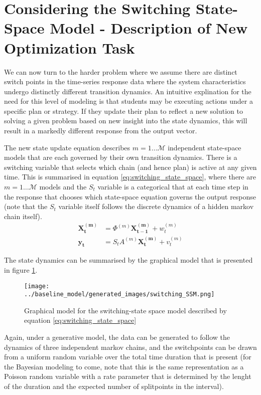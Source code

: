 \documentclass{article}
\begin{document}
\section{Considering the Switching State-Space Model - Description of New Optimization Task}

We can now turn to the harder problem where we assume there are distinct switch points in the time-series response data where the system characteristics undergo distinctly different transition dynamics. An intuitive explination for the need for this level of modeling is that students may be executing actions under a specific plan or strategy. If they update their plan to reflect a new solution to solving a given problem based on new insight into the state dynamics, this will result in a markedly different response from the output vector.

The new state update equation describes $m = 1 \hdots \mathcal{M}$ independent state-space models that are each governed by their own transition dynamics. There is a switching variable that selects which chain (and hence plan) is active at any given time. This is summarised in equation \ref{eq:switching_state_space}, where there are $m = 1 \hdots \mathcal{M}$ models and the $S_t$ variable is a categorical that at each time step in the response that chooses which state-space equation governs the output response (note that the $S_t$ variable itself follows the discrete dynamics of a hidden markov chain itself).
\begin{equation}\label{eq:switching_state_space}
  \begin{split}
      \mathbf{X^{(m)}_t} &= \Phi^{(m)}\mathbf{X^{(m)}_{t-1}} + w^{(m)}_t \\
      \mathbf{y_t} &= S_t A^{(m)}\mathbf{X^{(m)}_t} + v^{(m)}_t
  \end{split}
\end{equation}

The state dynamics can be summarised by the graphical model that is presented in figure \ref{fig:switching_ssm_graphical_model}.

\begin{figure}
\center
\texttt{[image: ../baseline\_model/generated\_images/switching\_SSM.png]}
\caption{Graphical model for the switching-state space model described by equation \ref{eq:switching_state_space}}\label{fig:switching_ssm_graphical_model}
\end{figure}

Again, under a generative model, the data can be generated to follow the dynamics of three independent markov chains, and the switchpoints can be drawn from a uniform random variable over the total time duration that is present (for the Bayesian modeling to come, note that this is the same representation as a Poisson random variable with a rate parameter that is determined by the lenght of the duration and the expected number of splitpoints in the interval).
\end{document}
